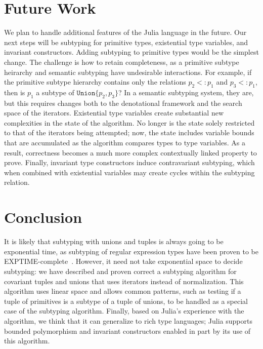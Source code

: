 \documentclass[a4paper,english]{lipics-v2019}
\newcommand{\xt}[1]{\texttt{#1}}
\newcommand{\union}[2]{\xt{Union\{}#1,#2\xt{\}}}
\newcommand{\sub}{<:}
\begin{document}
\section{Future Work}

We plan to handle additional features of the Julia language in the future. Our
next steps will be subtyping for primitive types, existential type variables,
and invariant constructors.  Adding subtyping to primitive types would be the
simplest change. The challenge is how to retain completeness, as a primitive
subtype heirarchy and semantic subtyping have undesirable interactions.  For
example, if the primitive subtype hierarchy contains only the relations $p_2
\sub p_1$ and $p_3 \sub p_1$, then is $p_1$ a subtype of $\union{p_2}{p_3}$?
In a semantic subtyping system, they are, but this requires changes both to
the denotational framework and the search space of the iterators.  Existential
type variables create substantial new complexities in the state of the
algorithm. No longer is the state solely restricted to that of the iterators
being attempted; now, the state includes variable bounds that are accumulated
as the algorithm compares types to type variables. As a result, correctness
becomes a much more complex contextually linked property to prove.  Finally,
invariant type constructors induce contravariant subtyping, which when
combined with existential variables may create cycles within the subtyping
relation.  

\section{Conclusion} It is likely that subtyping with unions and tuples is
always going to be exponential time, as subtyping of regular expression types
have been proven to be EXPTIME-complete~\cite{unionexptime}. However, it need
not take exponential space to decide subtyping: we have described and proven
correct a subtyping algorithm for covariant tuples and unions that uses
iterators instead of normalization. This algorithm uses linear space and
allows common patterns, such as testing if a tuple of primitives is a subtype
of a tuple of unions, to be handled as a special case of the subtyping
algorithm. Finally, based on Julia's experience with the algorithm, we think
that it can generalize to rich type languages; Julia supports bounded
polymorphism and invariant constructors enabled in part by its use of this
algorithm.



\medskip
\end{document}
